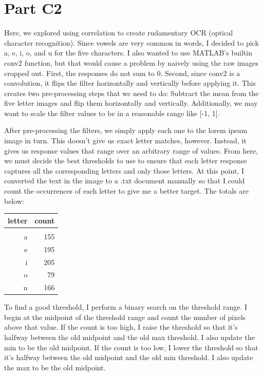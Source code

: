 \documentclass{article}
\begin{document}
\section{Part C2}

Here, we explored using correlation to create rudamentary OCR (optical character 
recognition). Since vowels are very common in words, I decided to pick a, e, i, 
o, and u for the five characters. I also wanted to use MATLAB's builtin conv2 
function, but that would cause a problem by naively using the raw images cropped 
out. First, the responses do not sum to 0. Second, since conv2 is a convolution, 
it flips the filter horizontally and vertically before applying it. This creates 
two pre-processing steps that we need to do: Subtract the mean from the five 
letter images and flip them horizontally and vertically. Additionally, we may 
want to scale the filter values to be in a reasonable range like [-1, 1].

After pre-processing the filters, we simply apply each one to the lorem ipsum 
image in turn. This doesn't give us exact letter matches, however. Instead, it 
gives us response values that range over an arbitrary range of values. From here, 
we must decide the best thresholds to use to ensure that each letter response 
captures all the corresponding letters and only those letters. At this point, I 
converted the text in the image to a .txt document manually so that I could count 
the occurrences of each letter to give me a better target. The totals are below:

\begin{tabular}{r | r}
    letter & count \\
    \hline         \\
         a &   155 \\
         e &   195 \\
         i &   205 \\
         o &    79 \\
         u &   166
\end{tabular}

To find a good threshold, I perform a binary search on the threshold range. I 
begin at the midpoint of the threshold range and count the number of pixels 
above that value. If the count is too high, I raise the threshold so that it's halfway 
between the old midpoint and the old max threshold. I also update the min to be the old midpoint. If the count is too low, I 
lower the threshold so that it's halfway between the old midpoint and the old 
min threshold. I also update the max to be the old midpoint.
\end{document}
